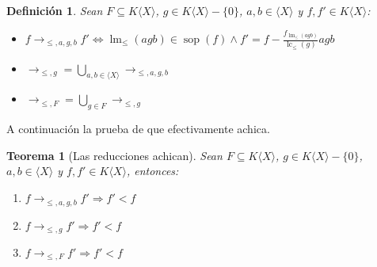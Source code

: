 \documentclass{report}
\theoremstyle{customstyle}
\newtheorem{definition}{Definición}[chapter]
\newtheorem{theorem}{Teorema}[chapter]
\theoremstyle{factstyle}
\DeclareMathOperator{\sop}{sop}
\DeclareMathOperator{\lm}{lm}
\DeclareMathOperator{\lc}{lc}
\begin{document}
\begin{definition}
  Sean $F ⊆ K⟨X⟩$, $g ∈ K⟨X⟩ - \{0\}$, $a, b ∈ ⟨X⟩$ y $f, f' ∈ K⟨X⟩$:
  \begin{itemize}
    \item $f →_{≤, a, g, b} f' ⇔ \lm_≤(agb) ∈ \sop(f) ∧ f' = f - \frac{f_{\lm_≤(agb)}}{\lc_≤(g)}agb$
    \item $→_{≤, g} = ⋃_{a, b ∈ ⟨X⟩} →_{≤, a, g, b}$
    \item $→_{≤, F} = ⋃_{g ∈ F} →_{≤, g}$
  \end{itemize}
\end{definition}

A continuación la prueba de que efectivamente achica.

\begin{theorem}[Las reducciones achican]\label{thm:→ achican}
  Sean $F ⊆ K⟨X⟩$, $g ∈ K⟨X⟩ - \{0\}$, $a, b ∈ ⟨X⟩$ y $f, f' ∈ K⟨X⟩$, entonces:
  \begin{enumerate}
    \item $f →_{≤, a, g, b} f' ⇒ f' < f$
    \item $f →_{≤, g} f' ⇒ f' < f$
    \item $f →_{≤, F} f' ⇒ f' < f$
  \end{enumerate}
\end{theorem}
\end{document}
